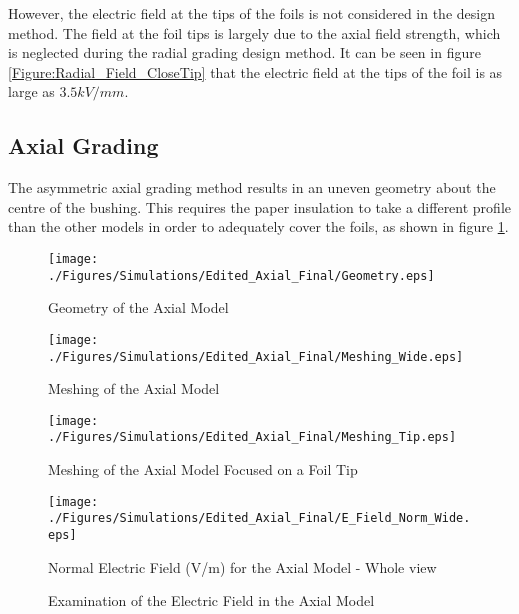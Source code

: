 However, the electric field at the tips of the foils is not considered in the design method.
The field at the foil tips is largely due to the axial field strength, which is neglected during the radial grading design method.
It can be seen in figure \ref{Figure:Radial_Field_CloseTip} that the electric field at the tips of the foil is as large as $3.5kV/mm$.


\subsection{Axial Grading}
The asymmetric axial grading method results in an uneven geometry about the centre of the bushing.
This requires the paper insulation to take a different profile than the other models in order to adequately cover the foils, as shown in figure \ref{Figure:Axial_Geom}.
\begin{figure}[!h]
  \centering
    \texttt{[image: ./Figures/Simulations/Edited\_Axial\_Final/Geometry.eps]} 
	\caption{Geometry of the Axial Model}
	\label{Figure:Axial_Geom}
\end{figure}

\begin{figure}[!h]
  \centering
    \texttt{[image: ./Figures/Simulations/Edited\_Axial\_Final/Meshing\_Wide.eps]} 
	\caption{Meshing of the Axial Model}
	\label{Figure:Axial_Mesh_wide}
\end{figure}

\begin{figure}[!h]
  \centering
    \texttt{[image: ./Figures/Simulations/Edited\_Axial\_Final/Meshing\_Tip.eps]} 
	\caption{Meshing of the Axial Model Focused on a Foil Tip}
	\label{Figure:Axial_Mesh_close}
\end{figure}

\begin{figure}[!h]
  \centering
    \texttt{[image: ./Figures/Simulations/Edited\_Axial\_Final/E\_Field\_Norm\_Wide.eps]} 
	\caption{Normal Electric Field (V/m) for the Axial Model - Whole view}
	\label{Figure:Radial_Field_Wide}
   \end{figure}

\begin{figure}[!h]
  \centering
{} 
\caption{Examination of the Electric Field in the Axial Model}
\label{Figure:No_Grading_Field}
\end{figure}

